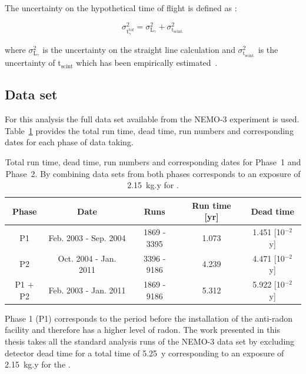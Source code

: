 \documentclass[main.tex]{subfiles}
\begin{document}
\bigskip


\NI The uncertainty on the hypothetical time of flight is defined as :  


\begin{equation}
\sigma^\text{2}_{\text{t}_\gamma^{\text{tof}}} = \sigma^\text{2}_{\text{L}_\gamma} + \sigma^\text{2}_{\text{t}_{\text{scint.}}}
\end{equation}


\bigskip


\NI where $\sigma^\text{2}_{\text{L}_\gamma}$ is the uncertainty on the straight line calculation and $\sigma^\text{2}_{\text{t}_{\text{scint.}}}$ is the uncertainty of t$_{\text{scint}}$ which has been empirically estimated~\cite{GammaReconstructionHereward}.


\FloatBarrier


\subsection{Data set}


\NI For this analysis the full data set available from the NEMO-3 experiment is used. Table~\ref{Tab:RunTimeNEMO3} provides the total run time, dead time, run numbers and corresponding dates for each phase of data taking.


\begin{table}[h!]
\centering
\begin{tabular}{c|c|c|c|c}
Phase   & Date                  & Runs        & Run time [yr] & Dead time  \\
\toprule
P1      & Feb. 2003 - Sep. 2004 & 1869 - 3395 & 1.073         & 1.451  [10$^{-\text{2}}$ y]  \\
P2      & Oct. 2004 - Jan. 2011 & 3396 - 9186 & 4.239         & 4.471  [10$^{-\text{2}}$ y]  \\
\hline
P1 + P2 & Feb. 2003 - Jan. 2011 & 1869 - 9186 & 5.312         & 5.922  [10$^{-\text{2}}$ y]  \\
\bottomrule
\end{tabular}
\caption{Total run time, dead time, run numbers and corresponding dates for Phase~1 and Phase~2. By combining data sets from both phases corresponds to an exposure of 2.15~kg.y for \Cd.}
\label{Tab:RunTimeNEMO3}
\end{table} 


\NI Phase 1 (P1) corresponds to the period before the installation of the anti-radon facility and therefore has a higher level of radon. The work presented in this thesis takes all the standard analysis runs of the NEMO-3 data set by excluding detector dead time for a total time of 5.25~y corresponding to an exposure of 2.15~kg.y for the \Cd .
\end{document}
